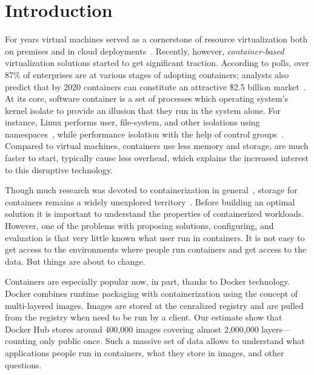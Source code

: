 \section{Introduction}

%

For years virtual machines served as a cornerstone of resource virtualization
both on premises and in cloud deployments~\cite{rosenblum2005virtual}.
%
Recently, however, \emph{container-based} virtualization solutions started to
get significant traction.
%
According to polls, over 87\% of enterprises are at various stages of adopting
containers; analysts also predict that by 2020 containers can constitute an
attractive \$2.5 billion market~\cite{container-grow-by2020}.
%
At its core, software container is a set of processes which operating system's
kernel isolate to provide an illusion that they
run in the system alone.
%
For instance, Linux performs user, file-system, and other isolations using
namespaces~\cite{man-namespaces}, while performance isolation with the help of
control groups~\cite{kernel-doc-cgroups}.
%
Compared to virtual machines, containers use less memory and storage, are much
faster to start, typically cause less overhead, which explains the increased
interest to this disruptive technology.


Though much research was devoted to containerization in
general~, storage for containers remains a widely unexplored
territory~\cite{login-container-storage-options}.
%
Before building an optimal solution it is important to understand the
properties of containerized workloads.
%
However, one of the problems with proposing solutions, configuring, and
evaluation is that very little known what user run in containers.
%
It is not easy to get access to the environments where people run containers
and get access to the data.
%
But things are about to change.


Containers are especially popular now, in part, thanks
to Docker technology.
%
Docker combines runtime packaging with containerization
using the concept of multi-layered images.
%
Images are stored at the cenralized registry
and are pulled from the registry when need to be run by a client.
%
Our estimate show that Docker Hub stores around 400,000 images
covering almost 2,000,000 layers---counting only public once.
%
Such a massive set of data allows to understand what applications
people run in containers, what they store in images, and other questions.



